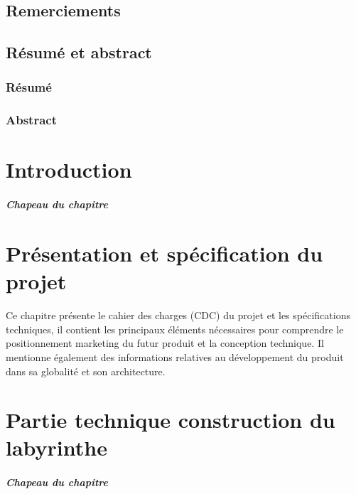 \documentclass[12pt, french]{report}
\begin{document}

\clearpage

\thispagestyle{empty}
\section*{Remerciements}

\clearpage
\thispagestyle{empty}
\section*{Résumé et abstract}
\subsection*{Résumé}

\subsection*{Abstract}

\clearpage
\setcounter{page}{1}
\tableofcontents
\listoffigures

\clearpage

\chapter{Introduction}
\paragraph{Chapeau du chapitre}

\clearpage

\chapter{Présentation et spécification du projet}
Ce chapitre présente le cahier des charges (CDC) du projet et les
spécifications techniques, il contient les principaux éléments nécessaires
pour comprendre le positionnement marketing du futur produit et la
conception technique. Il mentionne également des informations relatives au
développement du produit dans sa globalité et son architecture.


\clearpage

\chapter{Partie technique construction du labyrinthe}
\paragraph{Chapeau du chapitre}

\clearpage
\end{document}
